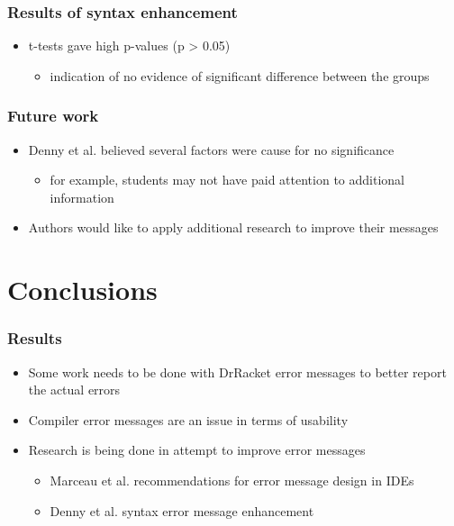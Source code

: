 \documentclass{beamer}
\begin{document}
\begin{frame}
	\frametitle{Results of syntax enhancement}
		\begin{itemize}
			\item t-tests gave high p-values (p > 0.05)
				\begin{itemize}
				\item indication of no evidence of significant difference between the groups
				\end{itemize}
		\end{itemize}

\end{frame}

\begin{frame}
	\frametitle{Future work}
		\begin{itemize}
			\item Denny et al. believed several factors were cause for no significance
			\begin{itemize}
				\item for example, students may not have paid attention to additional information
			\end{itemize}
			\item Authors would like to apply additional research to improve their messages
		\end{itemize}

\end{frame}


\section[Conclusions]{Conclusions}

\begin{frame}
	\frametitle{Results}
		\begin{itemize}
			\item Some work needs to be done with DrRacket error messages to better report the actual errors
			\item Compiler error messages are an issue in terms of usability
			\item Research is being done in attempt to improve error messages
			\begin{itemize}
				\item Marceau et al. recommendations for error message design in IDEs
				\item Denny et al. syntax error message enhancement
			\end{itemize}
		\end{itemize}

\end{frame}
\end{document}
